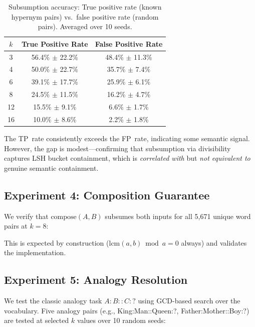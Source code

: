 \documentclass[10pt]{article}
\begin{document}
\begin{table}[ht]
\centering
\caption{Subsumption accuracy: True positive rate (known hypernym pairs) vs.\ false positive rate (random pairs). Averaged over 10 seeds.}
\label{tab:subsumption}
\begin{tabular}{ccc}
\toprule
$k$ & True Positive Rate & False Positive Rate \\
\midrule
3 & 56.4\% $\pm$ 22.2\% & 48.4\% $\pm$ 11.3\% \\
4 & 50.0\% $\pm$ 22.7\% & 35.7\% $\pm$ 7.4\% \\
6 & 39.1\% $\pm$ 17.7\% & 25.9\% $\pm$ 6.1\% \\
8 & 24.5\% $\pm$ 11.5\% & 16.2\% $\pm$ 4.7\% \\
12 & 15.5\% $\pm$ 9.1\% & 6.6\% $\pm$ 1.7\% \\
16 & 10.0\% $\pm$ 8.6\% & 2.2\% $\pm$ 1.8\% \\
\bottomrule
\end{tabular}
\end{table}

\noindent The TP~rate consistently exceeds the FP~rate, indicating some semantic signal. However, the gap is modest---confirming that subsumption via divisibility captures LSH bucket containment, which is \emph{correlated with} but \emph{not equivalent to} genuine semantic containment.

\subsection{Experiment 4: Composition Guarantee}

We verify that $\text{compose}(A,B)$ subsumes both inputs for all 5{,}671 unique word pairs at $k\!=\!8$:

\begin{center}
\end{center}

\noindent This is expected by construction ($\text{lcm}(a,b) \bmod a = 0$ always) and validates the implementation.

\subsection{Experiment 5: Analogy Resolution}

We test the classic analogy task $A:B::C:?$ using GCD-based search over the vocabulary. Five analogy pairs (e.g., King:Man::Queen:?, Father:Mother::Boy:?) are tested at selected $k$ values over 10 random seeds:
\end{document}
